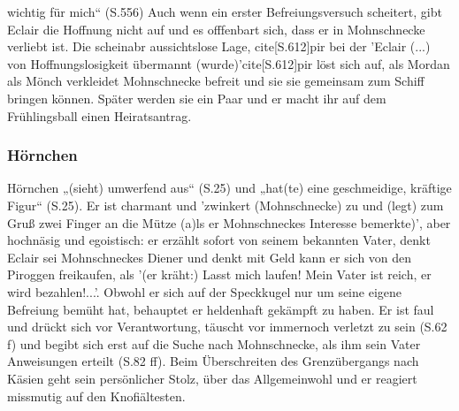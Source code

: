 wichtig für mich“ (S.556) Auch wenn ein erster Befreiungsversuch scheitert, gibt Eclair die Hoffnung nicht auf und es offfenbart sich, dass er in Mohnschnecke verliebt ist. \cite[S.603]{pir} Die scheinabr aussichtslose Lage, cite[S.612]{pir} bei der 'Eclair (...) von Hoffnungslosigkeit übermannt (wurde)'cite[S.612]{pir} löst sich auf, als Mordan als Mönch verkleidet Mohnschnecke befreit und sie sie gemeinsam zum Schiff bringen können.\cite[S.614]{pir} Später werden sie ein Paar \cite[S.631ff]{pir} und er macht ihr auf dem Frühlingsball einen Heiratsantrag.\cite[S.640ff]{pir }

\subsubsection{Hörnchen}

Hörnchen „(sieht) umwerfend aus“ (S.25) und „hat(te) eine geschmeidige, kräftige Figur“ (S.25). Er ist charmant und 'zwinkert (Mohnschnecke) zu und (legt) zum Gruß zwei Finger an die Mütze (a)ls er Mohnschneckes Interesse bemerkte)'\cite[S.25]{pir}, aber hochnäsig und egoistisch: er erzählt sofort von seinem bekannten Vater\cite[S.25]{pir}, denkt Eclair sei Mohnschneckes Diener\cite[S.26]{pir} und denkt mit Geld kann er sich von den Piroggen freikaufen, als '(er kräht:) Lasst mich laufen! Mein Vater ist reich, er wird bezahlen!...'.\cite[S.34]{pir} Obwohl er sich auf der Speckkugel nur um seine eigene Befreiung bemüht hat, behauptet er heldenhaft gekämpft zu haben.\cite[S.40]{pir} Er ist faul und drückt sich vor Verantwortung, täuscht vor immernoch verletzt zu sein (S.62 f) und begibt sich erst auf die Suche nach Mohnschnecke, als ihm sein Vater Anweisungen erteilt (S.82 ff). Beim Überschreiten des Grenzübergangs nach Käsien geht sein persönlicher Stolz, über das Allgemeinwohl und er reagiert missmutig auf den Knofiältesten.\cite[S.142f]{pir}
